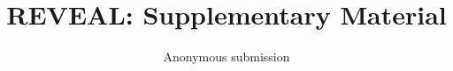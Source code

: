\documentclass[10pt,twocolumn,letterpaper]{article}
\title{REVEAL: Supplementary Material}
\author{Anonymous submission}
\begin{document}
\raggedbottom
\maketitle


{\small}
\end{document}
